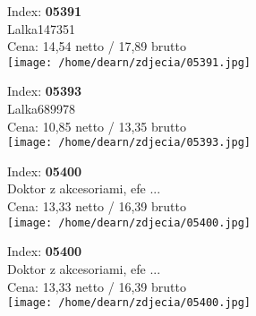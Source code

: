 {Index: \textbf{05391}\\
Lalka147351\\
Cena: 14,54 netto / 17,89 brutto\\
  \texttt{[image: /home/dearn/zdjecia/05391.jpg]}}\newline\newline

{Index: \textbf{05393}\\
Lalka689978\\
Cena: 10,85 netto / 13,35 brutto\\
  \texttt{[image: /home/dearn/zdjecia/05393.jpg]}}\newline\newline

{Index: \textbf{05400}\\
Doktor z akcesoriami, efe ...\\
Cena: 13,33 netto / 16,39 brutto\\
  \texttt{[image: /home/dearn/zdjecia/05400.jpg]}}\newline\newline

{Index: \textbf{05400}\\
Doktor z akcesoriami, efe ...\\
Cena: 13,33 netto / 16,39 brutto\\
  \texttt{[image: /home/dearn/zdjecia/05400.jpg]}}\newline\newline
